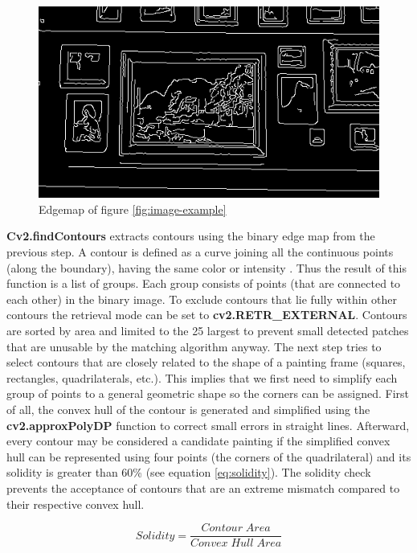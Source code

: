 \begin{figure}[htbp]
    \includegraphics[width=\linewidth]{images/edgemap-example.png}
    \caption{Edgemap of figure \ref{fig:image-example}}
    \label{fig:edgemap-example}
\end{figure}

\textbf{Cv2.findContours} extracts contours using the binary edge map from the previous step. A contour is defined as a curve joining all the continuous points (along the boundary), having the same color or intensity \cite{opencvContours}. Thus the result of this function is a list of groups. Each group consists of points (that are connected to each other) in the binary image. To exclude contours that lie fully within other contours the retrieval mode can be set to \textbf{cv2.RETR\_EXTERNAL}. Contours are sorted by area and limited to the 25 largest to prevent small detected patches that are unusable by the matching algorithm anyway. The next step tries to select contours that are closely related to the shape of a painting frame (squares, rectangles, quadrilaterals, etc.). This implies that we first need to simplify each group of points to a general geometric shape so the corners can be assigned. First of all, the convex hull of the contour is generated and simplified using the \textbf{cv2.approxPolyDP} function to correct small errors in straight lines. Afterward, every contour may be considered a candidate painting if the simplified convex hull can be represented using four points (the corners of the quadrilateral) and its solidity is greater than 60\% (see equation \ref{eq:solidity}). The solidity check prevents the acceptance of contours that are an extreme mismatch compared to their respective convex hull.

\begin{equation}
    \label{eq:solidity}
    Solidity = \frac{Contour \; Area}{Convex \; Hull \; Area}
\end{equation}

